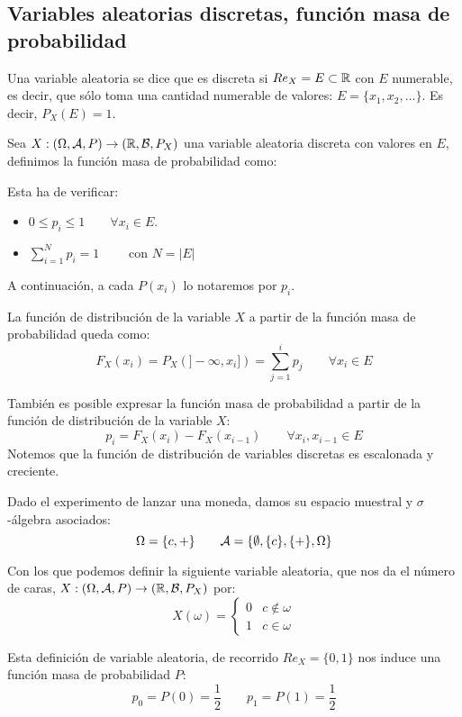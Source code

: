 \subsection{Variables aleatorias discretas, función masa de probabilidad}

\begin{definicion}
    Una variable aleatoria se dice que es discreta si $Re_X = E \subset \mathbb R$ con $E$ numerable, es decir, que sólo toma una cantidad numerable de valores: $E = \{x_1, x_2, \ldots\}$. Es decir, $P_X(E)=1$.
\end{definicion}

\begin{definicion}
    Sea $X: (\Omega, \mathcal{A}, P) \rightarrow (\mathbb R, \mathcal{B}, P_X)$ una variable aleatoria discreta con valores en $E$, definimos la función masa de probabilidad como:

    Esta ha de verificar:
    \begin{itemize}
        \item $0 \leq p_i \leq 1 \qquad \forall x_i \in E$.
        \item $\sum\limits_{i = 1}^N p_i = 1 \qquad $ con $N = |E|$
    \end{itemize}
\end{definicion}
\begin{notacion}
    A continuación, a cada $P(x_i)$ lo notaremos por $p_i$.
\end{notacion}

La función de distribución de la variable $X$ a partir de la función masa de probabilidad queda como:
$$F_X(x_i) = P_X(]-\infty, x_i]) = \sum_{j=1}^i p_j \qquad \forall x_i \in E$$


También es posible expresar la función masa de probabilidad a partir de la función de distribución de la variable $X$:
$$p_i = F_X(x_i) - F_X(x_{i-1}) \qquad \forall x_i,x_{i-1}\in E$$
Notemos que la función de distribución de variables discretas es escalonada y creciente.

\begin{ejemplo}
    Dado el experimento de lanzar una moneda, damos su espacio muestral y $\sigma$-álgebra asociados:
    $$\Omega = \{c, +\} \qquad \mathcal{A}=\{\emptyset, \{c\}, \{+\}, \Omega\}$$
    
    Con los que podemos definir la siguiente variable aleatoria, que nos da el número de caras,
    $X:(\Omega, \mathcal{A}, P) \rightarrow (\mathbb R, \mathcal{B}, P_X)$ por:
    $$X(\omega) = \left\{ \begin{array}{cc}
        0 & c \notin \omega \\
        1 & c \in \omega
    \end{array} \right.$$
    
    Esta definición de variable aleatoria, de recorrido $Re_X = \{0,1\}$ nos induce una función masa de probabilidad $P$:
    $$p_0 = P(0) = \frac{1}{2} \qquad p_1 = P(1) = \frac{1}{2}$$
\end{ejemplo}

